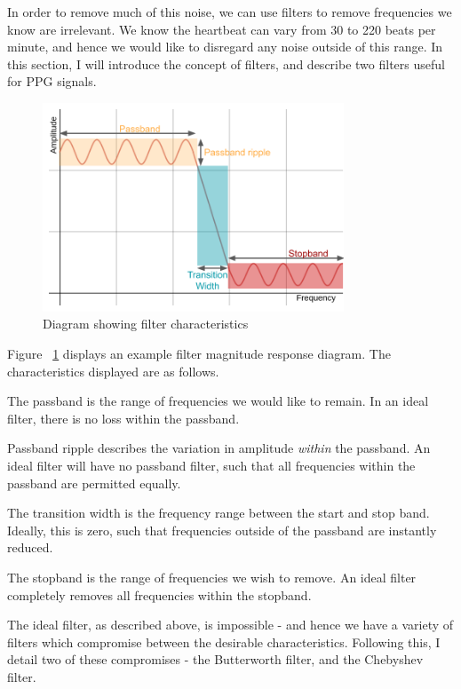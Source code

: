 \documentclass[12pt,a4paper,twoside,openright]{report}
\begin{document}
In order to remove much of this noise, we can use filters to remove
frequencies we know are irrelevant. We know the heartbeat can vary from 
30 to 220 beats per minute, and hence we would like to disregard any noise 
outside of this range. In this section, I will introduce the concept of 
filters, and describe two filters useful for PPG signals.

\begin{figure}[h!]
	\centerline{\includegraphics[width=0.8\textwidth]{figs/filter.png}}
\caption{Diagram showing filter characteristics}
\label{fig:filterdiag}
\end{figure}

Figure ~\ref{fig:filterdiag} displays an example filter magnitude response
diagram. The characteristics displayed are as follows.

The passband is the range of frequencies we would like to remain. In an ideal
filter, there is no loss within the passband.

Passband ripple describes the variation in amplitude \emph{within} the
passband. An ideal filter will have no passband filter, such that all
frequencies within the passband are permitted equally.

The transition width is the frequency range between the start and stop band.
Ideally, this is zero, such that frequencies outside of the passband are
instantly reduced.

The stopband is the range of frequencies we wish to remove. An ideal filter
completely removes all frequencies within the stopband.

The ideal filter, as described above, is impossible - and hence we have a
variety of filters which compromise between the desirable characteristics.
Following this, I detail two of these compromises - the Butterworth filter,
and the Chebyshev filter.
\end{document}
